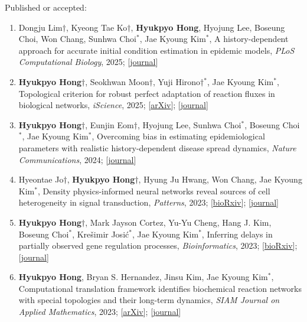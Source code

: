 \documentclass[margin,line]{res}
\begin{document}
\begin{resume}
\begin{enumerate}[leftmargin=*]
\end{enumerate}

\vspace{-5pt}
Published or accepted: \vspace{7pt}
\begin{enumerate}[leftmargin=*]
    \item Dongju Lim$\dagger$, Kyeong Tae Ko$\dagger$, \textbf{Hyukpyo Hong}, Hyojung Lee, Boseung Choi, Won Chang, Sunhwa Choi${}^*$, Jae Kyoung Kim${}^*$, A history-dependent approach for accurate initial condition estimation in epidemic models, \textit{PLoS Computational Biology}, 2025; [\href{https://doi.org/10.1371/journal.pcbi.1013438}{\ul{journal}}]

    \item \textbf{Hyukpyo Hong}$\dagger$, Seokhwan Moon$\dagger$, Yuji Hirono$\dagger$${}^*$, Jae Kyoung Kim${}^*$, Topological criterion for robust perfect adaptation of reaction fluxes in biological networks, \textit{iScience}, 2025; [\href{https://doi.org/10.48550/arXiv.2302.01270}{\ul{arXiv}}]; [\href{https://doi.org/10.1016/j.isci.2025.112394}{\ul{journal}}]

    \item \textbf{Hyukpyo Hong}$\dagger$, Eunjin Eom$\dagger$, Hyojung Lee, Sunhwa Choi${}^*$, Boseung Choi${}^*$, Jae Kyoung Kim${}^*$, Overcoming bias in estimating epidemiological parameters with realistic history-dependent disease spread dynamics, \textit{Nature Communications}, 2024; [\href{https://doi.org/10.1038/s41467-024-53095-7}{\ul{journal}}]

    \item Hyeontae Jo$\dagger$, \textbf{Hyukpyo Hong}$\dagger$, Hyung Ju Hwang, Won Chang, Jae Kyoung Kim${}^*$, Density physics-informed neural networks reveal sources of cell heterogeneity in signal transduction, \textit{Patterns}, 2023; [\href{https://doi.org/10.1101/2023.07.31.551393}{\ul{bioRxiv}}]; [\href{https://doi.org/10.1016/j.patter.2023.100899}{\ul{journal}}]

    \item \textbf{Hyukpyo Hong}$\dagger$, Mark Jayson Cortez, Yu-Yu Cheng, Hang J. Kim, Boseung Choi${}^*$, Krešimir Josić${}^*$, Jae Kyoung Kim${}^*$, Inferring delays in partially observed gene regulation processes, \textit{Bioinformatics}, 2023; [\href{https://doi.org/10.1101/2022.11.27.518074}{\ul{bioRxiv}}]; [\href{https://doi.org/10.1093/bioinformatics/btad670}{\ul{journal}}]

    \item \textbf{Hyukpyo Hong}, Bryan S. Hernandez, Jinsu Kim, Jae Kyoung Kim${}^*$, Computational translation framework identifies biochemical reaction networks with special topologies and their long-term dynamics, \textit{SIAM Journal on Applied Mathematics}, 2023; [\href{https://doi.org/10.48550/arXiv.2212.01171}{\ul{arXiv}}]; [\href{https://doi.org/10.1137/22M150469X}{\ul{journal}}]


\end{enumerate}
\end{resume}
\end{document}
